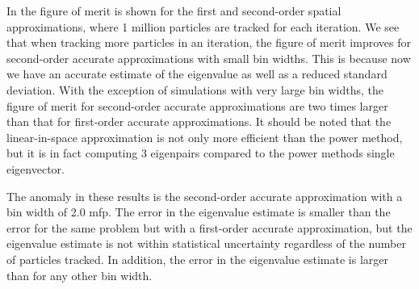 In  the figure of merit is shown for the first and second-order spatial approximations, where 1 million particles are tracked for each iteration.  We see that when tracking more particles in an iteration, the figure of merit improves for second-order accurate approximations with small bin widths.  This is because now we have an accurate estimate of the eigenvalue as well as a reduced standard deviation.  With the exception of simulations with very large bin widths, the figure of merit for second-order accurate approximations are two times larger than that for first-order accurate approximations.  It should be noted that the linear-in-space approximation is not only more efficient than the power method, but it is in fact computing 3 eigenpairs compared to the power methods single eigenvector. 

The anomaly in these results is the second-order accurate approximation with a bin width of 2.0 mfp.  The error in the eigenvalue estimate is smaller than the error for the same problem but with a first-order accurate approximation, but the eigenvalue estimate is not within statistical uncertainty regardless of the number of particles tracked.  In addition, the error in the eigenvalue estimate is larger than for any other bin width.

\begin{comment}
\begin{sidewaysfigure} \centering
    
    \caption{Eigenvalue bias for second-order spatial discretization with 1 million particles tracked.}
    \label{fig:BiasSecondOrder1E6}
\end{sidewaysfigure}
\end{comment}

